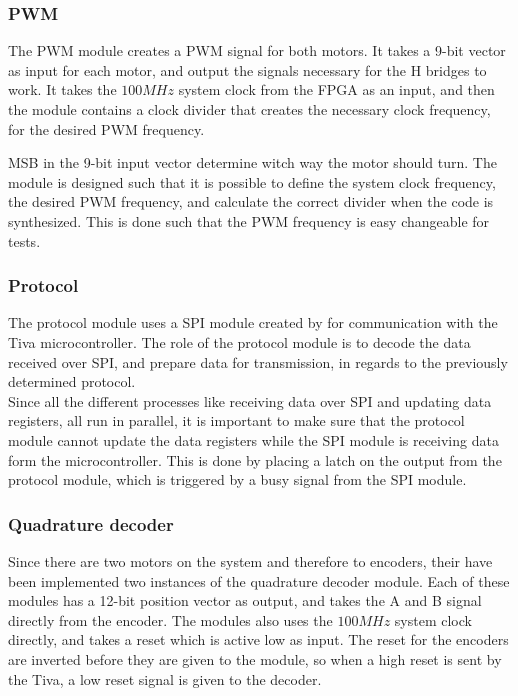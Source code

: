 \documentclass[../../../main]{subfiles}
\begin{document}
\subsubsection{PWM}
The PWM module creates a PWM signal for both motors. It takes a 9-bit vector as input for each motor, and output the signals necessary for the H bridges to work.
It takes the $100 \si{MHz}$ system clock from the FPGA as an input, and then the module contains a clock divider that creates the necessary clock frequency, for the desired PWM frequency.


MSB in the 9-bit input vector determine witch way the motor should turn.
The module is designed such that it is possible to define the system clock frequency, the desired PWM frequency, and calculate the correct divider when the code is synthesized.
This is done such that the PWM frequency is easy changeable for tests.
\subsubsection{Protocol}
The protocol module uses a SPI module created by  for communication with the Tiva microcontroller. 
The role of the protocol module is to decode the data received over SPI, and prepare data for transmission, in regards to the previously determined protocol.
\\
Since all the different processes like receiving data over SPI and updating data registers, all run in parallel, it is important to make sure that the protocol module cannot update the data registers while the SPI module is receiving data form the microcontroller.
This is done by placing a latch on the output from the protocol module, which is triggered by a busy signal from the SPI module.

\subsubsection{Quadrature decoder}
Since there are two motors on the system and therefore to encoders,  their have been implemented two instances of the quadrature decoder module.
Each of these modules has a 12-bit position vector as output, and takes the  A and B signal directly from the encoder. The modules also uses the $100 \si{MHz}$ system clock directly, and takes a reset which is active low as input.
The reset for the encoders are inverted before they are given to the module, so when a high reset is sent by the Tiva, a low reset signal is given to the decoder.
\end{document}
